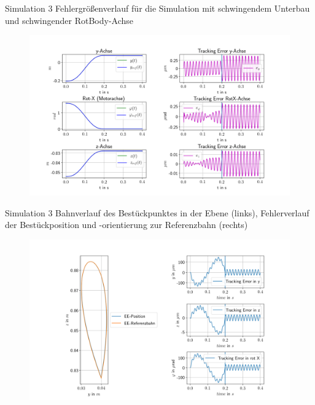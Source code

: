 \documentclass[10pt,xcolor=dvipsnames]{beamer}
\begin{document}
	\begin{frame}{Simulation 3}
		Fehlergrößenverlauf für die Simulation mit schwingendem Unterbau und schwingender RotBody-Achse
		\vspace{-0.2cm}
		\begin{figure}
			\includegraphics[width=0.99\linewidth]{./pics/posVerlaufAchsen_ZundTheta.png}
		\end{figure}
	\end{frame}

	\begin{frame}{Simulation 3}
		Bahnverlauf des Bestückpunktes in der Ebene (links), Fehlerverlauf der Bestückposition und -orientierung zur Referenzbahn (rechts)
		\vspace{-0.2cm}
		\begin{figure}
		\includegraphics[width=0.999\linewidth]{./pics/endeffektor_ZundTheta.png}
		\end{figure}
	\end{frame}
\end{document}
